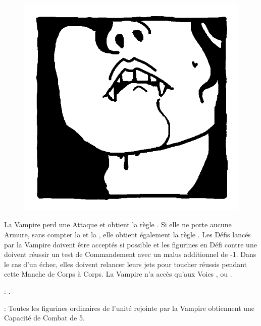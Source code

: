 \newpage
{}

\begin{figure}
\centering
\includegraphics[width=\logosize]{pics/logo_lamia.png}
\end{figure}
La Vampire perd une Attaque et obtient la règle \lightningreflexes{}. Si elle ne porte aucune Armure, sans compter la \mountsprotection{} et la \innatedefence{}, elle obtient également la règle \distracting{}. Les Défis lancés par la Vampire doivent être acceptés si possible et les figurines en Défi contre une \lamia{} doivent réussir un test de Commandement avec un malus additionnel de -1. Dans le cas d'un échec, elles doivent relancer leurs jets pour toucher réussis pendant cette Manche de Corps à Corps. La Vampire n'a accès qu'aux Voies \light{}, \shadows{} ou \necromancy{}.

\vspace{0.5cm}
\bloodties{} : \textbf{\courtofthedamned}.

\vspace{0.5cm}
\ancientbloodpower{} : \textbf{\commandment}\dotfill{}\newline%
Toutes les figurines ordinaires de l'unité rejointe par la Vampire obtiennent une Capacité de Combat de 5.


